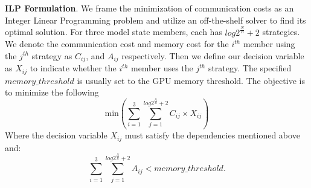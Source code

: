 





\noindent\textbf{ILP Formulation}.
We frame the minimization of communication costs as an Integer Linear Programming problem and utilize an off-the-shelf solver to find its optimal solution. For three model state members, each has \( {log2^\frac{N}{R}+2} \) strategies. We denote the communication cost and memory cost for the $i^{th}$ member using the $j^{th}$ strategy as \( C_{ij} \), and \( A_{ij} \) respectively. Then we define our decision variable as \( X_{ij} \) to indicate whether the $i^{th}$ member uses the $j^{th}$ strategy. The specified $memory\_threshold$ is usually set to the GPU memory threshold. The objective is to minimize the following
\[ \text{min} \left( \sum_{i=1}^{3} \sum_{j=1}^{log2^\frac{N}{R}+2} C_{ij} \times X_{ij} \right) \]
Where the decision variable \( X_{ij} \) must satisfy the dependencies mentioned above and: \[ \sum_{i=1}^{3} \sum_{j=1}^{log2^\frac{N}{R}+2} A_{ij} < memory\_threshold. \] 

